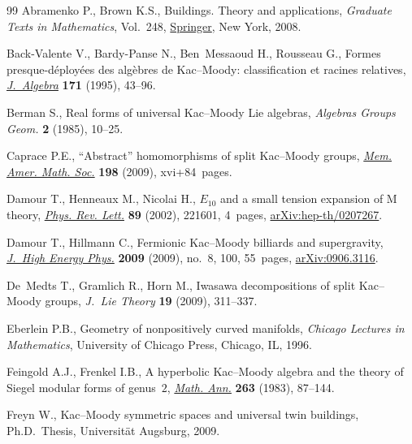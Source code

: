 \documentclass[11pt]{article}
\numberwithin{equation}{section}
\numberwithin{equation}{section}
\begin{document}
\begin{thebibliography}{99}
Abramenko P., Brown K.S., Buildings. Theory and applications, \textit{Graduate
 Texts in Mathematics}, Vol.~248, \href{https://doi.org/10.1007/978-0-387-78835-7}{Springer}, New York, 2008.

Back-Valente V., Bardy-Panse N., Ben~Messaoud H., Rousseau G., Formes
 presque-d\'eploy\'ees des alg\`ebres de {K}ac--{M}oody: classification et
 racines relatives, \href{https://doi.org/10.1006/jabr.1995.1004}{\textit{J.~Algebra}} \textbf{171} (1995), 43--96.

Berman S., Real forms of universal {K}ac--{M}oody {L}ie algebras,
 \textit{Algebras Groups Geom.} \textbf{2} (1985), 10--25.

Caprace P.E., ``{A}bstract'' homomorphisms of split {K}ac--{M}oody groups,
 \href{https://doi.org/10.1090/memo/0924}{\textit{Mem. Amer. Math. Soc.}} \textbf{198} (2009), xvi+84~pages.

Damour T., Henneaux M., Nicolai H., {$E_{10}$} and a small tension expansion of
 {M} theory, \href{https://doi.org/10.1103/PhysRevLett.89.221601}{\textit{Phys. Rev. Lett.}} \textbf{89} (2002), 221601, 4~pages,
 \href{https://arxiv.org/abs/hep-th/0207267}{arXiv:hep-th/0207267}.

Damour T., Hillmann C., Fermionic {K}ac--{M}oody billiards and supergravity,
 \href{https://doi.org/10.1088/1126-6708/2009/08/100}{\textit{J.~High Energy Phys.}} \textbf{2009} (2009), no.~8, 100, 55~pages,
 \href{https://arxiv.org/abs/0906.3116}{arXiv:0906.3116}.

De~Medts T., Gramlich R., Horn M., Iwasawa decompositions of split
 {K}ac--{M}oody groups, \textit{J.~Lie Theory} \textbf{19} (2009), 311--337.

Eberlein P.B., Geometry of nonpositively curved manifolds, \textit{Chicago Lectures in
 Mathematics}, University of Chicago Press, Chicago, IL, 1996.

Feingold A.J., Frenkel I.B., A hyperbolic {K}ac--{M}oody algebra and the theory
 of {S}iegel modular forms of genus~{$2$}, \href{https://doi.org/10.1007/BF01457086}{\textit{Math. Ann.}} \textbf{263}
 (1983), 87--144.

Freyn W., {K}ac--{M}oody symmetric spaces and universal twin buildings, Ph.D.~Thesis, {U}niversit\"at {A}ugsburg, 2009.


\end{thebibliography}
\end{document}
